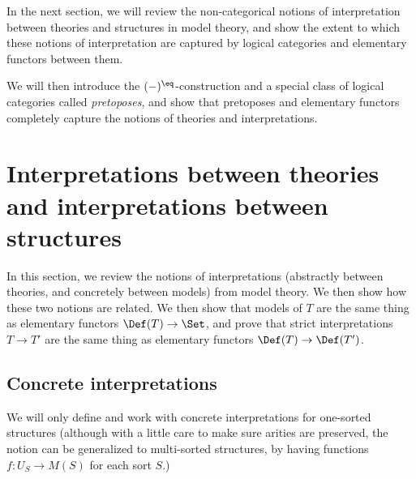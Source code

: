  In the next section, we will review the non-categorical notions of interpretation between theories and structures in model theory, and show the extent to which these notions of interpretation are captured by logical categories and elementary functors between them.

 We will then introduce the $(-)^{\eq}$-construction and a special class of logical categories called \emph{pretoposes}, and show that pretoposes and elementary functors completely capture the notions of theories and interpretations.

\section{Interpretations between theories and interpretations between structures}

In this section, we review the notions of interpretations (abstractly between theories, and concretely between models) from model theory. We then show how these two notions are related. We then show that models of $T$ are the same thing as elementary functors $\Def(T) \to \Set$, and prove that strict interpretations $T \to T'$ are the same thing as elementary functors $\Def(T) \to \Def(T')$.

\subsection{Concrete interpretations}

We will only define and work with concrete interpretations for one-sorted structures (although with a little care to make sure arities are preserved, the notion can be generalized to multi-sorted structures, by having functions $f : U_S \to M(S)$ for each sort $S$.)



